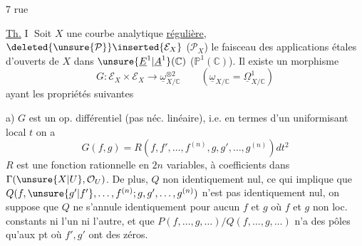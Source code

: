 

7 rue 



\uline{Th.} \textcircled{I} Soit $X$ une courbe analytique \uline{régulière},
$\deleted{\unsure{\mathcal{P}}}\inserted{\mathcal{E}_X}$ ($\mathcal{P}_X$) le
faisceau des applications étales d'ouverts de $X$ dans
$\unsure{\underline{E}^{1}|\underline{A}^{1}}(\mathbb{C})$
($\mathbb{P}^{1}(\mathbb{C})$). Il existe un morphisme
\[
G:\mathcal{E}_X\times\mathcal{E}_X\longrightarrow
\underline{\omega}_{X/\mathbb{C}}^{\otimes2}
\qquad
(\underline{\omega}_{X/\mathbb{C}}=\underline{\Omega}^{1}_{X/\mathbb{C}})
\]
ayant les propriétés suivantes

a) $G$ est un op. différentiel (pas néc. linéaire), i.e. en
termes d'un uniformisant local $t$  on a
\[
G(f,g)=R(f,f',\ldots,f^{(n)},g,g',\ldots,g^{(n)})dt^2
\]
$R$ est une fonction rationnelle en $2n$ variables, à
coefficients dans $\Gamma(\unsure{X|U},\mathcal{O}_U)$.
De plus, 
$Q$ non identiquement nul,  ce qui implique
que $Q(f,\unsure{g'|f'},\ldots,f^{(n)};g,g',\ldots,g^{(n)})$ n'est pas identiquement
nul, on suppose que $Q$ ne s'annule identiquement pour
aucun $f$ et $g$ où $f$ et $g$ non loc. constants ni l'un
ni l'autre, et que $P(f,\ldots,g,\ldots)/Q(f,\ldots,g,\ldots)$ n'a
 des pôles qu'aux pt où $f',g'$ ont des zéros.

